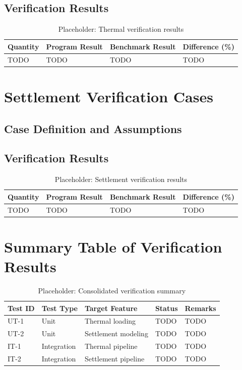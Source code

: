 \subsection{Verification Results}
\begin{table}[H]
    \centering
    \caption{Placeholder: Thermal verification results}
    \label{tab:thermal_verification}
    \begin{tabular}{llll}
        \toprule
        Quantity & Program Result & Benchmark Result & Difference (\%) \\
        \midrule
        TODO & TODO & TODO & TODO \\
        \bottomrule
    \end{tabular}
\end{table}

\section{Settlement Verification Cases}
\subsection{Case Definition and Assumptions}

\subsection{Verification Results}
\begin{table}[H]
    \centering
    \caption{Placeholder: Settlement verification results}
    \label{tab:settlement_verification}
    \begin{tabular}{llll}
        \toprule
        Quantity & Program Result & Benchmark Result & Difference (\%) \\
        \midrule
        TODO & TODO & TODO & TODO \\
        \bottomrule
    \end{tabular}
\end{table}

\section{Summary Table of Verification Results}
\begin{table}[H]
    \centering
    \caption{Placeholder: Consolidated verification summary}
    \label{tab:verification_summary}
    \begin{tabular}{lllll}
        \toprule
        Test ID & Test Type & Target Feature & Status & Remarks \\
        \midrule
        UT-1 & Unit & Thermal loading & TODO & TODO \\
        UT-2 & Unit & Settlement modeling & TODO & TODO \\
        IT-1 & Integration & Thermal pipeline & TODO & TODO \\
        IT-2 & Integration & Settlement pipeline & TODO & TODO \\
        \bottomrule
    \end{tabular}
\end{table}
